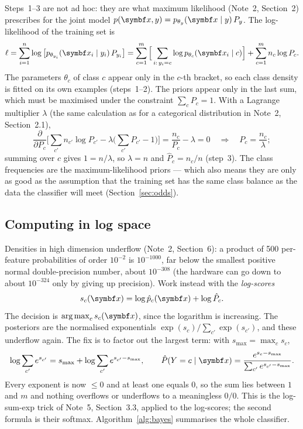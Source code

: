 \documentclass[11pt]{article}
\begin{document}
Steps~1--3 are not ad hoc: they are what maximum likelihood (Note~2, Section~2) prescribes for the joint model
$p(\x, y) = p_{\theta_y}(\x \mid y)\, P_y$. The log-likelihood of the training set is
\[
  \ell = \sum_{i=1}^n \log\big[p_{\theta_{y_i}}(\x_i \mid y_i)\, P_{y_i}\big]
  = \sum_{c=1}^m \Big[\sum_{i:\, y_i = c} \log p_{\theta_c}(\x_i \mid c)\Big] + \sum_{c=1}^m n_c \log P_c .
\]
The parameters $\theta_c$ of class $c$ appear only in the $c$-th bracket, so each class density is fitted on its own
examples (steps~1--2). The priors appear only in the last sum, which must be maximised under the constraint
$\sum_c P_c = 1$. With a Lagrange multiplier $\lambda$ (the same calculation as for a categorical distribution in
Note~2, Section~2.1),
\[
  \frac{\partial}{\partial P_c}\Big[\sum_{c'} n_{c'} \log P_{c'} - \lambda\Big(\sum_{c'} P_{c'} - 1\Big)\Big]
  = \frac{n_c}{P_c} - \lambda = 0
  \quad\Rightarrow\quad P_c = \frac{n_c}{\lambda} ;
\]
summing over $c$ gives $1 = n/\lambda$, so $\lambda = n$ and $\hat P_c = n_c / n$ (step~3). The class frequencies are the
maximum-likelihood priors --- which also means they are only as good as the assumption that the training set has the
same class balance as the data the classifier will meet (Section~\ref{sec:odds}).

\subsection{Computing in log space}\label{sec:logspace}

Densities in high dimension underflow (Note~2, Section~6): a product of 500 per-feature probabilities of order
$10^{-2}$ is $10^{-1000}$, far below the smallest positive normal double-precision number, about $10^{-308}$ (the
hardware can go down to about $10^{-324}$ only by giving up precision). Work instead with the
\emph{log-scores}
\[
  s_c(\x) = \log \hat p_c(\x) + \log \hat P_c .
\]
The decision is $\argmax_c s_c(\x)$, since the logarithm is increasing. The posteriors are the normalised
exponentials $\exp(s_c) / \sum_{c'} \exp(s_{c'})$, and these underflow again. The fix is to factor out the largest
term: with $s_{\max} = \max_c s_c$,
\[
  \log \sum_{c'} e^{s_{c'}} = s_{\max} + \log \sum_{c'} e^{s_{c'} - s_{\max}} ,
  \qquad
  \hat P(Y = c \mid \x) = \frac{e^{s_c - s_{\max}}}{\sum_{c'} e^{s_{c'} - s_{\max}}} .
\]
Every exponent is now $\le 0$ and at least one equals $0$, so the sum lies between $1$ and $m$ and nothing overflows or
underflows to a meaningless $0/0$. This is the log-sum-exp trick of Note~5, Section~3.3, applied to the log-scores;
the second formula is their softmax. Algorithm~\ref{alg:bayes} summarises the whole classifier.
\end{document}
